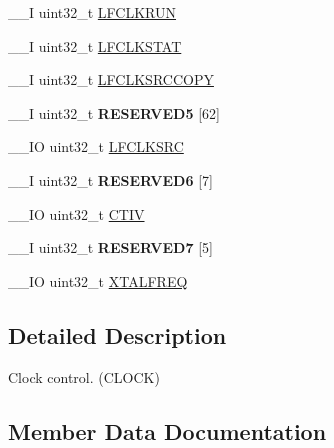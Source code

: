 \begin{DoxyCompactItemize}
\item 
\+\_\+\+\_\+\+I uint32\+\_\+t \hyperlink{struct_n_r_f___c_l_o_c_k___type_a73e4db86e02673c63fdc24d061e6f539}{L\+F\+C\+L\+K\+R\+U\+N}
\item 
\+\_\+\+\_\+\+I uint32\+\_\+t \hyperlink{struct_n_r_f___c_l_o_c_k___type_a0b777c7b6c89119bdfa682290f4a868f}{L\+F\+C\+L\+K\+S\+T\+A\+T}
\item 
\+\_\+\+\_\+\+I uint32\+\_\+t \hyperlink{struct_n_r_f___c_l_o_c_k___type_a1625c1285507bb511992383dd27b8d4a}{L\+F\+C\+L\+K\+S\+R\+C\+C\+O\+P\+Y}
\item 
\hypertarget{struct_n_r_f___c_l_o_c_k___type_a0cb889935d9f3acff66a9a9a1420dae7}{}\+\_\+\+\_\+\+I uint32\+\_\+t {\bfseries R\+E\+S\+E\+R\+V\+E\+D5} \mbox{[}62\mbox{]}\label{struct_n_r_f___c_l_o_c_k___type_a0cb889935d9f3acff66a9a9a1420dae7}

\item 
\+\_\+\+\_\+\+I\+O uint32\+\_\+t \hyperlink{struct_n_r_f___c_l_o_c_k___type_a1792dfe8b37612464bed867d4156d294}{L\+F\+C\+L\+K\+S\+R\+C}
\item 
\hypertarget{struct_n_r_f___c_l_o_c_k___type_aea2f9698b3edc4862988513014ce22b1}{}\+\_\+\+\_\+\+I uint32\+\_\+t {\bfseries R\+E\+S\+E\+R\+V\+E\+D6} \mbox{[}7\mbox{]}\label{struct_n_r_f___c_l_o_c_k___type_aea2f9698b3edc4862988513014ce22b1}

\item 
\+\_\+\+\_\+\+I\+O uint32\+\_\+t \hyperlink{struct_n_r_f___c_l_o_c_k___type_a6e019201a47f4e129b9a0fab2e8338a3}{C\+T\+I\+V}
\item 
\hypertarget{struct_n_r_f___c_l_o_c_k___type_ad9a8bc6459be01787d17c00b976fed2f}{}\+\_\+\+\_\+\+I uint32\+\_\+t {\bfseries R\+E\+S\+E\+R\+V\+E\+D7} \mbox{[}5\mbox{]}\label{struct_n_r_f___c_l_o_c_k___type_ad9a8bc6459be01787d17c00b976fed2f}

\item 
\+\_\+\+\_\+\+I\+O uint32\+\_\+t \hyperlink{struct_n_r_f___c_l_o_c_k___type_ac69cd7c4695de6d64f9bf61269851be9}{X\+T\+A\+L\+F\+R\+E\+Q}
\end{DoxyCompactItemize}


\subsection{Detailed Description}
Clock control. (C\+L\+O\+C\+K) 

\subsection{Member Data Documentation}
\hypertarget{struct_n_r_f___c_l_o_c_k___type_a6e019201a47f4e129b9a0fab2e8338a3}{}
